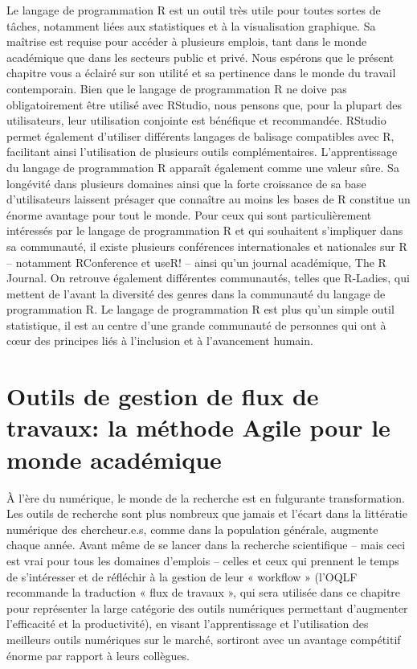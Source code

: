 \documentclass[
  letterpaper,
  DIV=11,
  numbers=noendperiod]{scrreprt}
\begin{document}
Le langage de programmation R est un outil très utile pour toutes sortes
de tâches, notamment liées aux statistiques et à la visualisation
graphique. Sa maîtrise est requise pour accéder à plusieurs emplois,
tant dans le monde académique que dans les secteurs public et privé.
Nous espérons que le présent chapitre vous a éclairé sur son utilité et
sa pertinence dans le monde du travail contemporain. Bien que le langage
de programmation R ne doive pas obligatoirement être utilisé avec
RStudio, nous pensons que, pour la plupart des utilisateurs, leur
utilisation conjointe est bénéfique et recommandée. RStudio permet
également d'utiliser différents langages de balisage compatibles avec R,
facilitant ainsi l'utilisation de plusieurs outils complémentaires.
L'apprentissage du langage de programmation R apparaît également comme
une valeur sûre. Sa longévité dans plusieurs domaines ainsi que la forte
croissance de sa base d'utilisateurs laissent présager que connaître au
moins les bases de R constitue un énorme avantage pour tout le monde.
Pour ceux qui sont particulièrement intéressés par le langage de
programmation R et qui souhaitent s'impliquer dans sa communauté, il
existe plusieurs conférences internationales et nationales sur R --
notamment RConference et useR! -- ainsi qu'un journal académique, The R
Journal. On retrouve également différentes communautés, telles que
R-Ladies, qui mettent de l'avant la diversité des genres dans la
communauté du langage de programmation R. Le langage de programmation R
est plus qu'un simple outil statistique, il est au centre d'une grande
communauté de personnes qui ont à cœur des principes liés à l'inclusion
et à l'avancement humain.


\hypertarget{sec-chap3}{%
\chapter{Outils de gestion de flux de travaux: la méthode Agile pour le
monde académique}\label{sec-chap3}}

À l'ère du numérique, le monde de la recherche est en fulgurante
transformation. Les outils de recherche sont plus nombreux que jamais et
l'écart dans la littératie numérique des chercheur.e.s, comme dans la
population générale, augmente chaque année. Avant même de se lancer dans
la recherche scientifique -- mais ceci est vrai pour tous les domaines
d'emplois -- celles et ceux qui prennent le temps de s'intéresser et de
réfléchir à la gestion de leur « workflow » (l'OQLF recommande la
traduction « flux de travaux », qui sera utilisée dans ce chapitre pour
représenter la large catégorie des outils numériques permettant
d'augmenter l'efficacité et la productivité), en visant l'apprentissage
et l'utilisation des meilleurs outils numériques sur le marché,
sortiront avec un avantage compétitif énorme par rapport à leurs
collègues.
\end{document}
